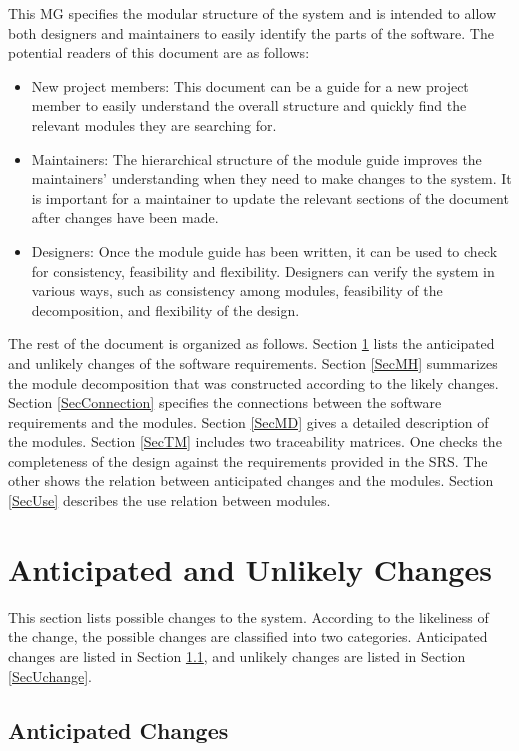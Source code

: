 \documentclass[12pt, titlepage]{article}
\begin{document}
This MG specifies the modular structure of the system and is intended to allow 
both
designers and maintainers to easily identify the parts of the software.  The
potential readers of this document are as follows:

\begin{itemize}
\item New project members: This document can be a guide for a new project member
  to easily understand the overall structure and quickly find the
  relevant modules they are searching for.
\item Maintainers: The hierarchical structure of the module guide improves the
  maintainers' understanding when they need to make changes to the system. It is
  important for a maintainer to update the relevant sections of the document
  after changes have been made.
\item Designers: Once the module guide has been written, it can be used to
  check for consistency, feasibility and flexibility. Designers can verify the
  system in various ways, such as consistency among modules, feasibility of the
  decomposition, and flexibility of the design.
\end{itemize}

The rest of the document is organized as follows. Section
\ref{SecChange} lists the anticipated and unlikely changes of the software
requirements. Section \ref{SecMH} summarizes the module decomposition that
was constructed according to the likely changes. Section \ref{SecConnection}
specifies the connections between the software requirements and the
modules. Section \ref{SecMD} gives a detailed description of the
modules. Section \ref{SecTM} includes two traceability matrices. One checks
the completeness of the design against the requirements provided in the SRS. The
other shows the relation between anticipated changes and the modules. Section
\ref{SecUse} describes the use relation between modules.

\section{Anticipated and Unlikely Changes} \label{SecChange}

This section lists possible changes to the system. According to the likeliness
of the change, the possible changes are classified into two
categories. Anticipated changes are listed in Section \ref{SecAchange}, and
unlikely changes are listed in Section \ref{SecUchange}.

\subsection{Anticipated Changes} \label{SecAchange}
\end{document}
